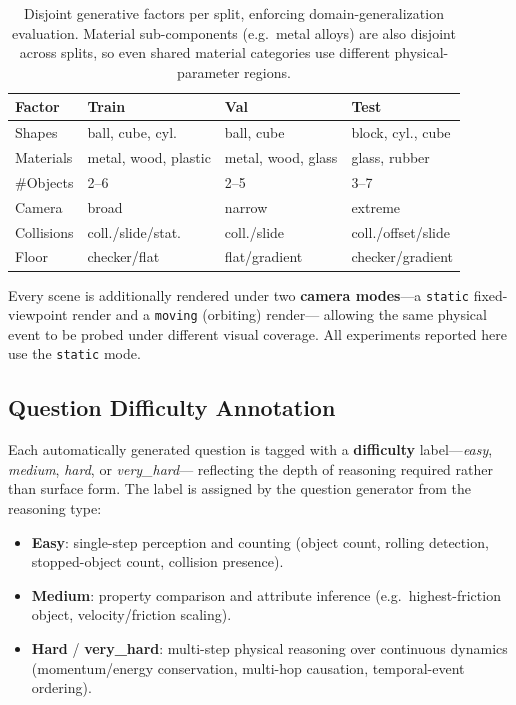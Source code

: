 \begin{table}[t]
\centering
\caption{Disjoint generative factors per split, enforcing
domain-generalization evaluation. Material sub-components (e.g.\ metal alloys)
are also disjoint across splits, so even shared material categories use
different physical-parameter regions.}
\label{tab:splits}
\small
\begin{tabular}{llll}
\toprule
Factor & Train & Val & Test \\
\midrule
Shapes        & ball, cube, cyl.   & ball, cube         & block, cyl., cube \\
Materials     & metal, wood, plastic & metal, wood, glass & glass, rubber \\
\#Objects     & 2--6               & 2--5               & 3--7 \\
Camera        & broad              & narrow             & extreme \\
Collisions    & coll./slide/stat.  & coll./slide        & coll./offset/slide \\
Floor         & checker/flat       & flat/gradient      & checker/gradient \\
\bottomrule
\end{tabular}
\end{table}

Every scene is additionally rendered under two \textbf{camera modes}---a
\texttt{static} fixed-viewpoint render and a \texttt{moving} (orbiting) render---
allowing the same physical event to be probed under different visual coverage.
All experiments reported here use the \texttt{static} mode.


\subsection{Question Difficulty Annotation}

Each automatically generated question is tagged with a \textbf{difficulty}
label---\textit{easy}, \textit{medium}, \textit{hard}, or \textit{very\_hard}---
reflecting the depth of reasoning required rather than surface form. The label is
assigned by the question generator from the reasoning type:

\begin{itemize}
  \item \textbf{Easy}: single-step perception and counting (object count, rolling
        detection, stopped-object count, collision presence).
  \item \textbf{Medium}: property comparison and attribute inference
        (e.g.\ highest-friction object, velocity/friction scaling).
  \item \textbf{Hard} / \textbf{very\_hard}: multi-step physical reasoning over
        continuous dynamics (momentum/energy conservation, multi-hop causation,
        temporal-event ordering).
\end{itemize}


